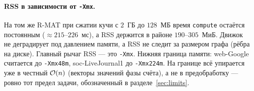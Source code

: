 \paragraph{RSS в зависимости от \texttt{-Xmx}.} На том же R-MAT при сжатии кучи с $2$~ГБ до
$128$~МБ время \texttt{compute} остаётся постоянным ($\approx 215$--$226$~мс), а RSS держится в районе
$190$--$305$~МиБ. Движок не деградирует под давлением памяти, а RSS не следит за размером графа (рёбра
на диске). Главный рычаг RSS --- это \texttt{-Xmx}. Нижняя граница памяти: web-Google считается до
\texttt{-Xmx48m}, soc-LiveJournal1 до \texttt{-Xmx224m}. На границе всё упирается уже в честный
$\mathcal{O}(n)$ (векторы значений фазы счёта), а не в предобработку --- ровно тот предел задачи,
обозначенный в разделе~\ref{sec:limits}.
